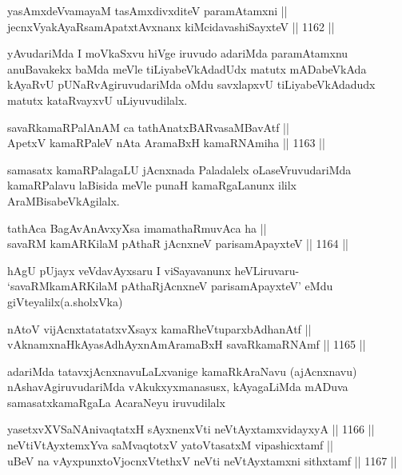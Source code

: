 \begin{shl}
yasAmxdeVvamayaM tasAmxdivxditeV paramAtamxni || \\
jecnxVyakAyaRsamApatxtAvxnanx kiMcidavashiSayxteV \hfill || 1162 ||  
\end{shl}

\begin{artha}
yAvudariMda I moVkaSxvu hiVge iruvudo adariMda paramAtamxnu anuBavakekx baMda meVle tiLiyabeVkAdadUdx matutx mADabeVkAda kAyaRvU pUNaRvAgiruvudariMda  oMdu savxlapxvU tiLiyabeVkAdadudx matutx kataRvayxvU uLiyuvudilalx.
\end{artha}

\begin{shl}
savaRkamaRPalAnAM ca tathA\s natxBARvasaMBavAtf || \\
ApetxV kamaRPaleV nAta AramaBxH kamaRNAmiha \hfill || 1163 ||  
\end{shl}

\begin{artha}
samasatx kamaRPalagaLU jAcnxnada Paladalelx oLaseVruvudariMda kamaRPalavu laBisida meVle punaH kamaRgaLanunx ililx AraMBisabeVkAgilalx.
\end{artha}

\begin{shl}
tathAca BagAvAnAvxyXsa imamathaRmuvAca ha || \\
savaRM kamARKilaM pAthaR jAcnxneV parisamApayxteV \hfill || 1164 ||  
\end{shl}

\begin{artha}
hAgU pUjayx veVdavAyxsaru I viSayavanunx heVLiruvaru- `savaRMkamARKilaM pAthaRjAcnxneV parisamApayxteV' eMdu giVteyalilx(a.sholxVka)
\end{artha}

\begin{shl}
nAtoV vijAcnxtatatatxvXsayx kamaRheVtuparxbAdhanAtf || \\
vAknamxnaHkAyasAdhAyxnAmAramaBxH savaRkamaRNAmf \hfill || 1165 ||  
\end{shl}

\begin{artha}
adariMda tatavxjAcnxnavuLaLxvanige kamaRkAraNavu (ajAcnxnavu) nAshavAgiruvudariMda vAkukxyxmanasusx, kAyagaLiMda mADuva samasatxkamaRgaLa AcaraNeyu iruvudilalx
\end{artha}

\begin{shl}
yasetxvXVSaNAnivaqtatxH sAyxnenxVti neVtAyxtamxvidayxyA \hfill || 1166 ||  \\
neVtiVtAyxtemxYva saMvaqtotxV yatoV\s tasatxM vipashicxtamf ||  \\
uBeV na vAyxpunxtoV\s jocnxVtethxV neVti neVtAyxtamxni sithxtamf \hfill || 1167 ||  
\end{shl}

